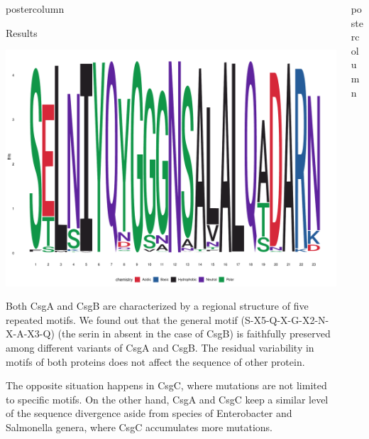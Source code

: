 \documentclass[final]{beamer}\usepackage[]{graphicx}\usepackage[]{color}
\makeatletter
\def\maxwidth{ %
  \ifdim\Gin@nat@width>\linewidth
    \linewidth
  \else
    \Gin@nat@width
  \fi
}
\newenvironment{knitrout}{}{} %
\newlength{\columnheight}
\makeatother
\begin{document}
\begin{frame}
\begin{columns}
\begin{column}{.50\textwidth}
\begin{beamercolorbox}[center,wd=\textwidth]{postercolumn}
\begin{minipage}[T]{.95\textwidth}
{  \begin{block}{Results}


\begin{knitrout}
\color{fgcolor}

{\centering \includegraphics[width=\maxwidth]{figure/unnamed-chunk-1-1} 

}



\end{knitrout}
  

Both CsgA and CsgB are characterized by a regional structure of five repeated motifs. We found out that the general motif (S-X5-Q-X-G-X2-N-X-A-X3-Q) (the serin in absent in the case of CsgB) is faithfully preserved among different variants of CsgA and CsgB. The residual variability in motifs of both proteins does not affect the sequence of other protein.

The opposite situation happens in CsgC, where mutations are not limited to specific motifs. On the other hand, CsgA and CsgC keep a similar level of the sequence divergence aside from species of Enterobacter and Salmonella genera, where CsgC accumulates more mutations.


    \end{block}
    \vfill
}
\end{minipage}
\end{beamercolorbox}
\end{column}



\begin{column}{.51\textwidth}
\begin{beamercolorbox}[center,wd=\textwidth]{postercolumn}
\begin{minipage}[T]{.95\textwidth}  
\parbox[t][\columnheight]{\textwidth}
{


}
\end{minipage}
\end{beamercolorbox}
\end{column}
\end{columns}
\end{frame}
\end{document}
